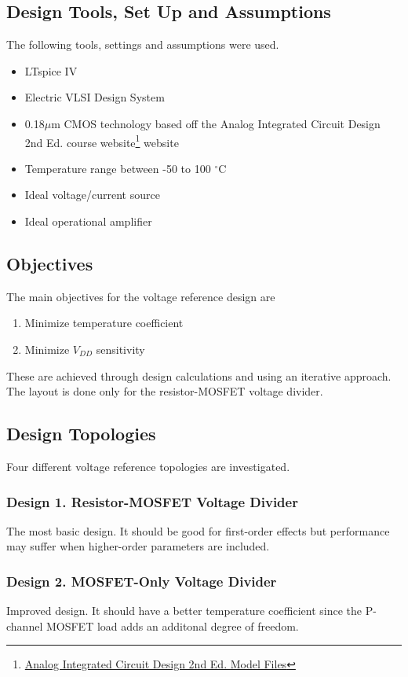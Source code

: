 \documentclass[conference]{IEEEtran}
\begin{document}
\subsection{Design Tools, Set Up and Assumptions}
The following tools, settings and assumptions were used.
\begin{itemize}
  \item LTspice IV
  \item Electric VLSI Design System
  \item 0.18$\mu$m CMOS technology based off the Analog Integrated Circuit Design 2nd Ed. course website\footnote{\href{http://analogicdesign.com/students/netlists-models/model-files/}{Analog Integrated Circuit Design 2nd Ed. Model Files}} website
  \item Temperature range between -50 to 100 $^\circ$C
  \item Ideal voltage/current source
  \item Ideal operational amplifier
\end{itemize}

\subsection{Objectives}
The main objectives for the voltage reference design are
\begin{enumerate}
  \item Minimize temperature coefficient
  \item Minimize $V_{DD}$ sensitivity
\end{enumerate}
These are achieved through design calculations and using an iterative approach.  The layout is done only for the resistor-MOSFET voltage divider.

\subsection{Design Topologies}
Four different voltage reference topologies are investigated.  %
\subsubsection{Design 1. Resistor-MOSFET Voltage Divider}
The most basic design.  It should be good for first-order effects but performance may suffer when higher-order parameters are included.
\subsubsection{Design 2. MOSFET-Only Voltage Divider}
Improved design.  It should have a better temperature coefficient since the P-channel MOSFET load adds an additonal degree of freedom.
\end{document}
